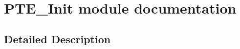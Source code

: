 \hypertarget{group___p_t_e___init__module}{}\section{P\+T\+E\+\_\+\+Init module documentation}
\label{group___p_t_e___init__module}


\subsection{Detailed Description}
